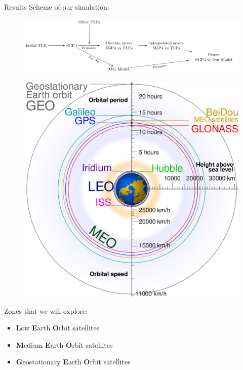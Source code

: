 \documentclass{beamer} %
\begin{document}
\begin{frame}{Results}
  Scheme of our simulation:
  \begin{figure}
    \centering
    \includegraphics[width=\textwidth]{../Images/simulation_scheme.pdf}
  \end{figure}
  \begin{minipage}{0.4\textwidth}
    \begin{figure}[ht]
      \centering
      \includegraphics[width=\textwidth]{../Images/satellite_orbits_custom.pdf}
    \end{figure}
  \end{minipage}\hfill
  \begin{minipage}{0.55\textwidth}
    Zones that we will explore:
    \begin{itemize}
      \item \textbf{L}ow \textbf{E}arth \textbf{O}rbit satellites
      \item \textbf{M}edium \textbf{E}arth \textbf{O}rbit satellites
      \item \textbf{G}eostationary \textbf{E}arth \textbf{O}rbit satellites
    \end{itemize}
  \end{minipage}
\end{frame}
\end{document}
